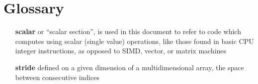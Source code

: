 \documentclass[acmsmall, nonacm=true]{acmart}
\begin{document}



\clearpage

\section*{Glossary}
\vspace{1em}
\begin{itemize}
\item[\textbf{scalar}]  {or ``scalar section'', is used in this document to refer to code which computes using scalar (single value) operations, like those found in basic CPU integer instructions, as opposed to SIMD, vector, or matrix machines}

\item[\textbf{stride}]  {defined on a given dimension of a multidimensional array, the space between consecutive indices}
\end{itemize}

\end{document}
